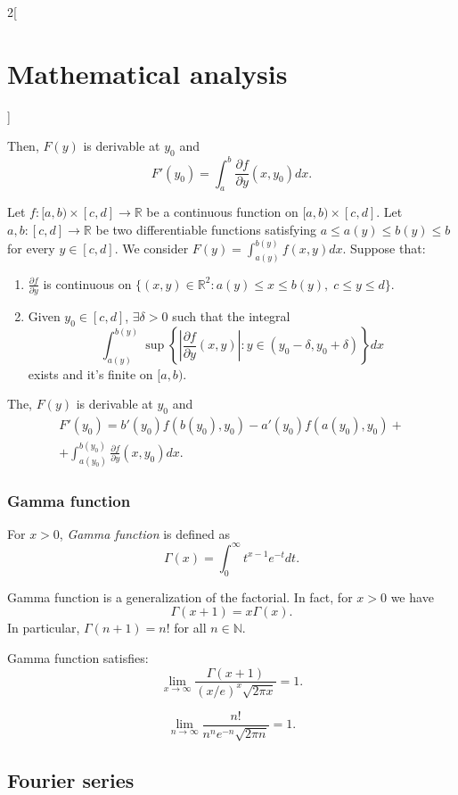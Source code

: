 \documentclass[class=article,crop=false]{standalone}
\begin{document}
\begin{multicols}{2}[\section{Mathematical analysis}]
\begin{theorem}
\begin{enumerate}
\end{enumerate} 
Then, $F(y)$ is derivable at $y_0$ and $$F'(y_0)=\int_a^b\frac{\partial f}{\partial y}(x,y_0)dx.$$
\end{theorem}
\begin{theorem}
Let $f:[a,b)\times[c,d]\rightarrow\mathbb{R}$ be a continuous function on $[a,b)\times[c,d]$. Let $a,b:[c,d]\rightarrow\mathbb{R}$ be two differentiable functions satisfying $a\leq a(y)\leq b(y)\leq b$ for every $y\in[c,d]$. We consider $\displaystyle F(y)=\int_{a(y)}^{b(y)}f(x,y)dx$. Suppose that:
\begin{enumerate}
    \item $\displaystyle\frac{\partial f}{\partial y}$ is continuous on $\{(x,y)\in\mathbb{R}^2:a(y)\leq x\leq b(y),\; c\leq y\leq d\}$.
    \item Given $y_0\in[c,d]$, $\exists\delta>0$ such that the integral $$\int_{a(y)}^{b(y)}\sup\left\{\left|\frac{\partial f}{\partial y}(x,y)\right|:y\in(y_0-\delta,y_0+\delta)\right\}dx$$ exists and it's finite on $[a,b)$.
\end{enumerate} 
The, $F(y)$ is derivable at $y_0$ and \begin{multline*}
    F'(y_0)=b'(y_0)f(b(y_0),y_0)-a'(y_0)f(a(y_0),y_0)+\\+\int_{a(y_0)}^{b(y_0)}\frac{\partial f}{\partial y}(x,y_0)dx.
\end{multline*}
\end{theorem}
\subsubsection*{Gamma function}
\begin{definition}
For $x>0$, \textit{Gamma function} is defined as $$\Gamma(x)=\int_0^\infty t^{x-1}e^{-t}dt.$$
\end{definition}
\begin{theorem}
Gamma function is a generalization of the factorial. In fact, for $x>0$ we have $$\Gamma(x+1)=x\Gamma(x).$$ In particular, $\Gamma(n+1)=n!$ for all $n\in\mathbb{N}$.
\end{theorem}
\begin{theorem}
Gamma function satisfies: $$\lim_{x\to\infty}\frac{\Gamma(x+1)}{(x/e)^x\sqrt{2\pi x}}=1.$$
\end{theorem}
\begin{corollary}
$$\lim_{n\to\infty}\frac{n!}{n^ne^{-n}\sqrt{2\pi n}}=1.$$
\end{corollary}
\subsection{Fourier series}

\end{multicols}
\end{document}
